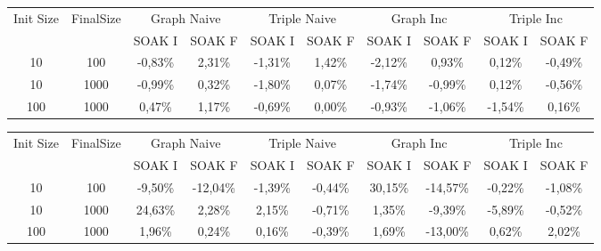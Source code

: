 \begin{sidewaystable}
	\centering
	\scriptsize
	\begin{tabular}{c|c|cc|cc|cc|cc} %
	  	\hline
		Init Size&FinalSize &\multicolumn{2}{c}{Graph Naive}  &\multicolumn{2}{c}{Triple Naive}&\multicolumn{2}{c}{Graph Inc}  &\multicolumn{2}{c}{Triple Inc}\\\
		&& SOAK I & SOAK F& SOAK I & SOAK F& SOAK I & SOAK F& SOAK I & SOAK F\\
		\hline
		\hline
		10&100&-0,83\%&2,31\%&-1,31\%&1,42\%&-2,12\%&0,93\%&0,12\%&-0,49\%\\
		10&1000&-0,99\%&0,32\%&-1,80\%&0,07\%&-1,74\%&-0,99\%&0,12\%&-0,56\%\\
		100&1000&0,47\%&1,17\%&-0,69\%&0,00\%&-0,93\%&-1,06\%&-1,54\%&0,16\%\\
		\hline
	\end{tabular}
	\caption[\textsc{Analyser} Investigation Stack - Level 1 \\ Step Response Test Average Latency Comparison]{\textsc{Analyser} Investigation Stack - Level 1 - Step Response Test average latency comparison.}
	\label{tab:step_latency_comparisons_mean}	
	
	\begin{tabular}{c|c|cc|cc|cc|cc} %
	  	\hline
		Init Size&FinalSize &\multicolumn{2}{c}{Graph Naive}  &\multicolumn{2}{c}{Triple Naive}&\multicolumn{2}{c}{Graph Inc}  &\multicolumn{2}{c}{Triple Inc}\\\
		&& SOAK I & SOAK F& SOAK I & SOAK F& SOAK I & SOAK F& SOAK I & SOAK F\\
		\hline
		\hline
		10&100&-9,50\%&-12,04\%&-1,39\%&-0,44\%&30,15\%&-14,57\%&-0,22\%&-1,08\%\\
		10&1000&24,63\%&2,28\%&2,15\%&-0,71\%&1,35\%&-9,39\%&-5,89\%&-0,52\%\\
		100&1000&1,96\%&0,24\%&0,16\%&-0,39\%&1,69\%&-13,00\%&0,62\%&2,02\%\\
		\hline
	\end{tabular}
	\caption[\textsc{Analyser} Investigation Stack - Level 1 \\ Step Response Test Average Memory Comparison]{\textsc{Analyser} Investigation Stack - Level 1 - Step Response Test average memory comparison.}
	\label{tab:step_memory_comparisons_mean}



\end{sidewaystable}
